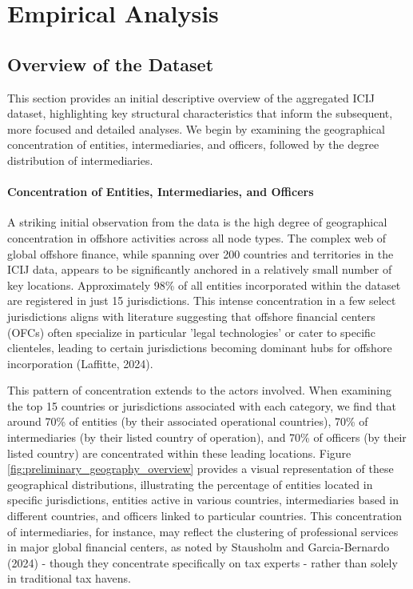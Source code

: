 \chapter{Empirical Analysis}
\label{chap:empirical_analysis}

\section{Overview of the Dataset}
\label{subsec:overview_dataset}
This section provides an initial descriptive overview of the aggregated ICIJ dataset, highlighting key structural characteristics that inform the subsequent, more focused and detailed analyses. We begin by examining the geographical concentration of entities, intermediaries, and officers, followed by the degree distribution of intermediaries.

\subsubsection{Concentration of Entities, Intermediaries, and Officers}
\label{subsubsec:concentration_elements}
A striking initial observation from the data is the high degree of geographical concentration in offshore activities across all node types. The complex web of global offshore finance, while spanning over 200 countries and territories in the ICIJ data, appears to be significantly anchored in a relatively small number of key locations. Approximately 98\% of all entities incorporated within the dataset are registered in just 15 jurisdictions. This intense concentration in a few select jurisdictions aligns with literature suggesting that offshore financial centers (OFCs) often specialize in particular 'legal technologies' or cater to specific clienteles, leading to certain jurisdictions becoming dominant hubs for offshore incorporation (Laffitte, 2024).

This pattern of concentration extends to the actors involved. When examining the top 15 countries or jurisdictions associated with each category, we find that around 70\% of entities (by their associated operational countries), 70\% of intermediaries (by their listed country of operation), and 70\% of officers (by their listed country) are concentrated within these leading locations. Figure \ref{fig:preliminary_geography_overview} provides a visual representation of these geographical distributions, illustrating the percentage of entities located in specific jurisdictions, entities active in various countries, intermediaries based in different countries, and officers linked to particular countries. This concentration of intermediaries, for instance, may reflect the clustering of professional services in major global financial centers, as noted by Stausholm and Garcia-Bernardo (2024) - though they concentrate specifically on tax experts - rather than solely in traditional tax havens. 


